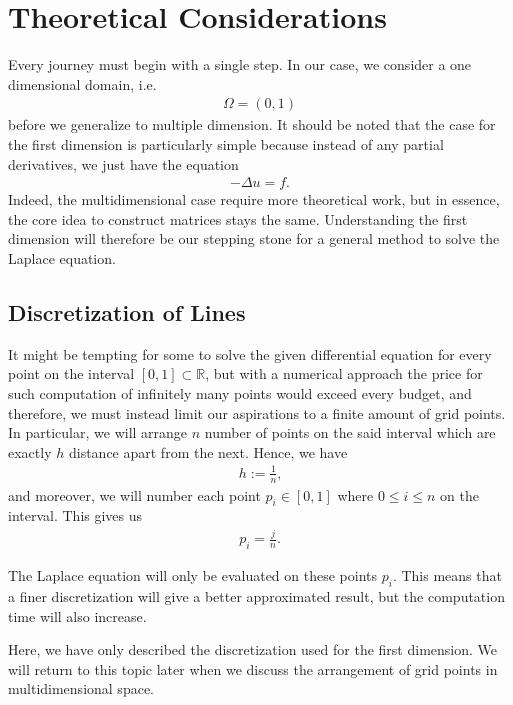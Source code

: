 \section{Theoretical Considerations}

Every journey must begin with a single step. In our case, we consider a one dimensional domain, i.e.
\begin{align*}
    \Omega = (0, 1)
\end{align*}
before we generalize to multiple dimension. It should be noted that the case for the first dimension is particularly simple because instead of any partial derivatives, we just have the equation
\begin{align*}
    - \Delta u = f \text{.}
\end{align*}
Indeed, the multidimensional case require more theoretical work, but in essence, the core idea to construct matrices stays the same. Understanding the first dimension will therefore be our stepping stone for a general method to solve the Laplace equation.

\subsection{Discretization of Lines}

It might be tempting for some to solve the given differential equation for every point on the interval \([0, 1] \subset \mathbb{R}\), but with a numerical approach the price for such computation of infinitely many points would exceed every budget, and therefore, we must instead limit our aspirations to a finite amount of grid points. In particular, we will arrange \(n\) number of points on the said interval which are exactly \(h\) distance apart from the next. Hence, we have
\begin{align*}
	h := \frac{1}{n} \text{,}
\end{align*}
and moreover, we will number each point \(p_i \in [0, 1]\) where \(0 \leq i \leq n\)  on the interval. This gives us
\begin{align*}
	p_i = \frac{j}{n} \text{.}
\end{align*}

The Laplace equation will only be evaluated on these points \(p_i\). This means that a finer discretization will give a better approximated result, but the computation time will also increase.

Here, we have only described the discretization used for the first dimension. We will return to this topic later when we discuss the arrangement of grid points in multidimensional space.

